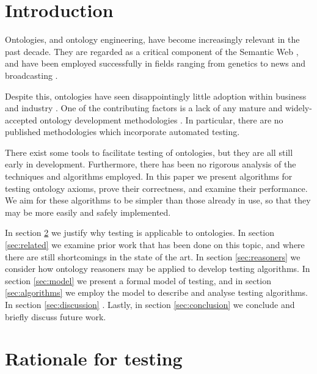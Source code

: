 \documentclass[paper.tex]{subfiles}
\begin{document}
\section{Introduction}
\label{sec:intro}

Ontologies, and ontology engineering, have become increasingly relevant in the past decade.  They are regarded as a critical component of the Semantic Web \cite{BernersLee:SemanticWeb}, and have been employed successfully in fields ranging from genetics \cite{GeneOntology:GoingForward} to news and broadcasting \cite{BBC:LinkedData}.

Despite this, ontologies have seen disappointingly little adoption within business and industry \cite{Cardoso:SemanticWebVision, Kaczmarek:EnterpriseModelling}.  One of the contributing factors is a lack of any mature and widely-accepted ontology development methodologies \cite{Iqbal:Methodologies}.  In particular, there are no published methodologies which incorporate automated testing.

There exist some tools to facilitate testing of ontologies, but they are all still early in development.  Furthermore, there has been no rigorous analysis of the techniques and algorithms employed.  In this paper we present algorithms for testing ontology axioms, prove their correctness, and \todo[maybe?] examine their performance.  We aim for these algorithms to be simpler than those already in use, so that they may be more easily and safely implemented.  

In section \ref{sec:rationale} we justify why testing is applicable to ontologies.
In section \ref{sec:related} we examine prior work that has been done on this topic, and where there are still shortcomings in the state of the art.
In section \ref{sec:reasoners} we consider how ontology reasoners may be applied to develop testing algorithms.
In section \ref{sec:model} we present a formal model of testing, and in section \ref{sec:algorithms} we employ the model to describe and analyse testing algorithms.
In section \ref{sec:discussion} .
Lastly, in section \ref{sec:conclusion} we conclude and briefly discuss future work.

\section{Rationale for testing}
\label{sec:rationale}
\end{document}
